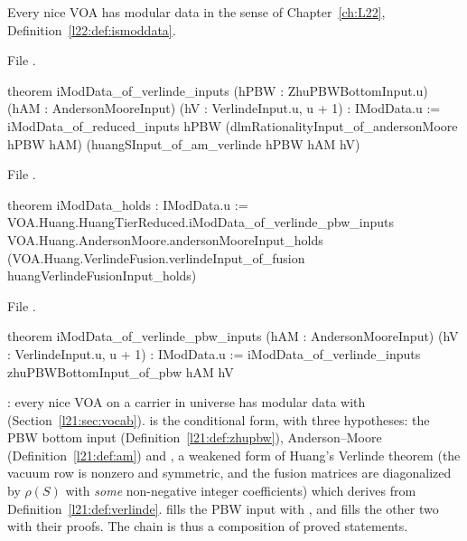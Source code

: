 \begin{theorem}\label{l21:thm:imoddata}
Every nice VOA has modular data in the sense of Chapter~\ref{ch:L22}, Definition~\ref{l22:def:ismoddata}.
\end{theorem}
\noindent File .
\begin{leancode}
theorem iModData_of_verlinde_inputs (hPBW : ZhuPBWBottomInput.{u}) (hAM : AndersonMooreInput)
    (hV : VerlindeInput.{u, u + 1}) : IModData.{u} :=
  iModData_of_reduced_inputs hPBW (dlmRationalityInput_of_andersonMoore hPBW hAM)
    (huangSInput_of_am_verlinde hPBW hAM hV)
\end{leancode}
\noindent File .
\begin{leancode}
theorem iModData_holds : IModData.{u} :=
  VOA.Huang.HuangTierReduced.iModData_of_verlinde_pbw_inputs
    VOA.Huang.AndersonMoore.andersonMooreInput_holds
    (VOA.Huang.VerlindeFusion.verlindeInput_of_fusion huangVerlindeFusionInput_holds)
\end{leancode}
\noindent File .
\begin{leancode}
theorem iModData_of_verlinde_pbw_inputs (hAM : AndersonMooreInput)
    (hV : VerlindeInput.{u, u + 1}) : IModData.{u} :=
  iModData_of_verlinde_inputs zhuPBWBottomInput_of_pbw hAM hV
\end{leancode}

\begin{dictionary}
: every nice VOA on a carrier in universe  has modular data  with
 (Section~\ref{l21:sec:vocab}).  is the conditional form, with
three  hypotheses: the PBW bottom input (Definition~\ref{l21:def:zhupbw}), Anderson--Moore
(Definition~\ref{l21:def:am}) and , a weakened form of Huang's Verlinde theorem (the vacuum row is
nonzero and symmetric, and the fusion matrices are diagonalized by $\rho(S)$ with \emph{some} non-negative integer
coefficients) which  derives from Definition~\ref{l21:def:verlinde}.
 fills the PBW input with , and
 fills the other two with their proofs. The chain is thus a composition of proved statements.
\end{dictionary}

